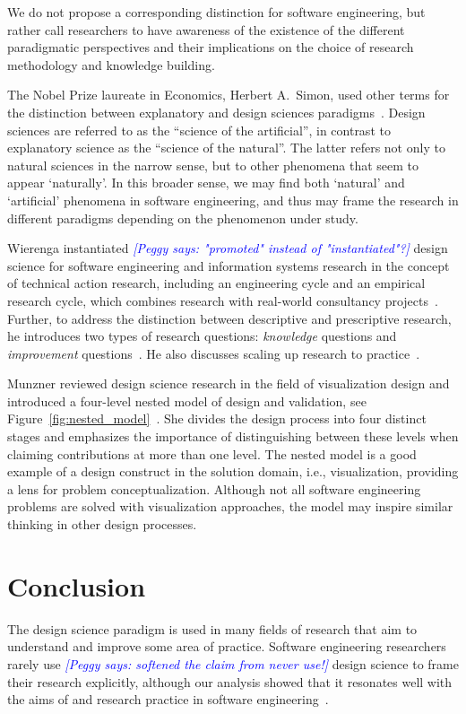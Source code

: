 \documentclass[graybox]{svmult}
\newcommand{\peggy}[1]{\textcolor{blue}{{\it [Peggy says: #1]}}}
\newcommand{\peggy}[1]{}
\begin{document}
We do not propose a corresponding distinction for software engineering, but rather call researchers to have awareness of the existence of the different paradigmatic perspectives and their implications on the choice of research methodology and knowledge building.

The Nobel Prize laureate in Economics, Herbert A.\ Simon, used other terms for the distinction between explanatory and design sciences paradigms~\cite{Simons69}. Design sciences are referred to as the ``science of the artificial'', in contrast to explanatory science as the ``science of the natural''. The latter refers not only to natural sciences in the narrow sense, but to other phenomena that seem to appear `naturally'. In this broader sense, we may find both `natural' and `artificial' phenomena in software engineering, and thus may frame the research in different paradigms depending on the phenomenon under study. 


Wierenga instantiated \peggy{"promoted" instead of "instantiated"?} design science for software engineering and information systems research in the concept of technical action research, including an engineering cycle and an empirical research cycle, which combines research with real-world consultancy projects~\cite{wieringa_six_2015,wieringa_technical_2012,wieringa_what_2014}. Further, to address the distinction between descriptive and prescriptive research, he introduces two types of research questions: \emph{knowledge} questions and \emph{improvement} questions~\cite{wieringa_design_2009}. He also discusses scaling up research to practice~\cite{Wieringa2014}. 

Munzner reviewed design science research in the field of visualization design and introduced a four-level nested model of design and validation, see Figure~\ref{fig:nested_model}~\cite{munzner2009}. She divides the design process into four distinct stages and emphasizes the importance of distinguishing between these levels when claiming contributions at more than one level. The nested model is a good example of a design construct in the solution domain, i.e., visualization, providing a lens for problem conceptualization. Although not all software engineering problems are solved with visualization approaches, the model may inspire similar thinking in other design processes. 


\section{Conclusion}
\label{sec:conclusion}
The design science paradigm is used in many fields of research that aim to understand and improve some area of practice. Software engineering researchers rarely use \peggy{softened the claim from never use!} design science to frame their research explicitly, although our analysis showed that it resonates well with the aims of and research practice in software engineering~\cite{Engstrom19arxiv}. 
\end{document}
